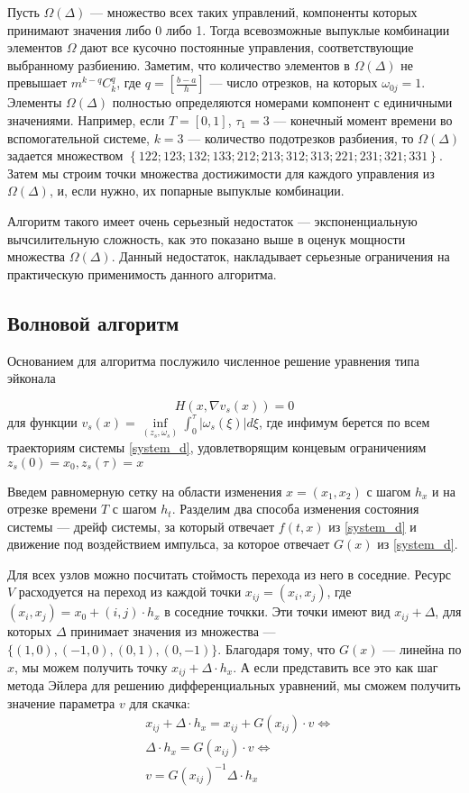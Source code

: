 Пусть $\Omega(\Delta)$ --- множество всех таких управлений, компоненты
которых принимают значения либо 0 либо 1. Тогда всевозможные выпуклые
комбинации элементов $\Omega$ дают все кусочно постоянные управления,
соответствующие выбранному разбиению.  Заметим, что количество
элементов в $\Omega(\Delta)$ не превышает $m^{k-q} C_k^q$, где
$q=\left[\frac{b-a}{h}\right]$ --- число отрезков, на которых
$\omega_{0j}=1$.  Элементы $\Omega(\Delta)$ полностью определяются
номерами компонент с единичными значениями. Например, если $T=[0,1]$,
$\tau_1=3$ --- конечный момент времени во вспомогательной системе,
$k=3$ --- количество подотрезков разбиения, то $\Omega(\Delta)$
задается множеством
$\left\{122; 123 ; 132 ; 133 ;212 ; 213; 312 ; 313 ; 221; 231 ; 321 ;
  331 \right\}$.
Затем мы строим точки множества достижимости для каждого управления из
$\Omega(\Delta)$, и, если нужно, их попарные выпуклые комбинации.

Алгоритм такого имеет очень серьезный недостаток --- экспоненциальную
вычсилительную сложность, как это показано выше в оценук мощности
множества $\Omega(\Delta)$. Данный недостаток, накладывает серьезные
ограничения на практическую применимость данного алгоритма.

\subsection{Волновой алгоритм}
\label{sec:wave_alg}

Основанием для алгоритма послужило численное решение уравнения типа
эйконала \cite{S1999} 

\begin{equation*}
  H(x,\nabla v_s(x)) = 0
\end{equation*}
для функции $v_s(x) = \inf \limits_{(z_s,\omega_s)} \int_0^\tau
| \omega_s(\xi) | d\xi$, где инфимум берется по всем траекториям
системы \eqref{system_d}, удовлетворящим концевым ограничениям $z_s(0)
= x_0, z_s(\tau) = x$

Введем равномерную сетку на области изменения $x=(x_1,x_2)$ с шагом
$h_x$ и на отрезке времени $T$ с шагом $h_t$.
Разделим два способа изменения состояния системы — дрейф системы, за
который отвечает $f(t,x)$ из \eqref{system_d} и
движение под воздействием импульса, за которое отвечает $G(x)$ из
\eqref{system_d}.

Для всех узлов можно посчитать стоймость перехода из него в соседние.
Ресурс $V$ расходуется на переход из каждой точки
$x_{ij} = (x_i,x_j)$, где $(x_i,x_j) = x_0 + (i,j)\cdot h_x$ в
соседние точкки. Эти точки имеют вид $x_{ij} +\Delta$, для которых
$\Delta$ принимает значения из множества --- $
\{(1,0),(-1,0),(0,1),(0,-1)\}$.
Благодаря тому, что $G(x)$ --- линейна по $x$, мы можем получить точку
$x_{ij} +\Delta \cdot h_x$. А если представить все это как шаг метода
Эйлера для решению дифференциальных уравнений, мы сможем получить
значение параметра $v$ для скачка:
\begin{eqnarray*}
  &x_{ij} +\Delta \cdot h_x = x_{ij} + G(x_{ij})\cdot v \Leftrightarrow\\
  &\Delta \cdot h_x = G(x_{ij})\cdot v \Leftrightarrow\\
  &v = G(x_{ij})^{-1} \Delta \cdot h_x
\end{eqnarray*}

